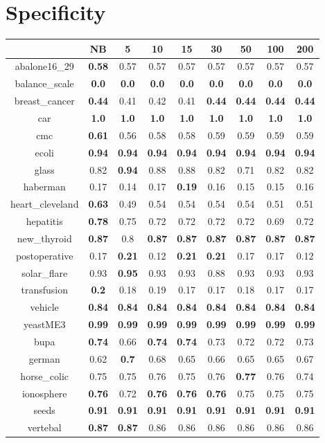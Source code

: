 \documentclass{article}%
\begin{document}
%
\section*{Specificity}%
\begin{tabular}{c|cccccccc}%
\hline%
&NB&5&10&15&30&50&100&200\\%
\hline%
abalone16\_29&\textbf{0.58}&0.57&0.57&0.57&0.57&0.57&0.57&0.57\\%
\hline%
balance\_scale&\textbf{0.0}&\textbf{0.0}&\textbf{0.0}&\textbf{0.0}&\textbf{0.0}&\textbf{0.0}&\textbf{0.0}&\textbf{0.0}\\%
\hline%
breast\_cancer&\textbf{0.44}&0.41&0.42&0.41&\textbf{0.44}&\textbf{0.44}&\textbf{0.44}&\textbf{0.44}\\%
\hline%
car&\textbf{1.0}&\textbf{1.0}&\textbf{1.0}&\textbf{1.0}&\textbf{1.0}&\textbf{1.0}&\textbf{1.0}&\textbf{1.0}\\%
\hline%
cmc&\textbf{0.61}&0.56&0.58&0.58&0.59&0.59&0.59&0.59\\%
\hline%
ecoli&\textbf{0.94}&\textbf{0.94}&\textbf{0.94}&\textbf{0.94}&\textbf{0.94}&\textbf{0.94}&\textbf{0.94}&\textbf{0.94}\\%
\hline%
glass&0.82&\textbf{0.94}&0.88&0.88&0.82&0.71&0.82&0.82\\%
\hline%
haberman&0.17&0.14&0.17&\textbf{0.19}&0.16&0.15&0.15&0.16\\%
\hline%
heart\_cleveland&\textbf{0.63}&0.49&0.54&0.54&0.54&0.54&0.51&0.51\\%
\hline%
hepatitis&\textbf{0.78}&0.75&0.72&0.72&0.72&0.72&0.69&0.72\\%
\hline%
new\_thyroid&\textbf{0.87}&0.8&\textbf{0.87}&\textbf{0.87}&\textbf{0.87}&\textbf{0.87}&\textbf{0.87}&\textbf{0.87}\\%
\hline%
postoperative&0.17&\textbf{0.21}&0.12&\textbf{0.21}&\textbf{0.21}&0.17&0.17&0.12\\%
\hline%
solar\_flare&0.93&\textbf{0.95}&0.93&0.93&0.88&0.93&0.93&0.93\\%
\hline%
transfusion&\textbf{0.2}&0.18&0.19&0.17&0.17&0.18&0.17&0.17\\%
\hline%
vehicle&\textbf{0.84}&\textbf{0.84}&\textbf{0.84}&\textbf{0.84}&\textbf{0.84}&\textbf{0.84}&\textbf{0.84}&\textbf{0.84}\\%
\hline%
yeastME3&\textbf{0.99}&\textbf{0.99}&\textbf{0.99}&\textbf{0.99}&\textbf{0.99}&\textbf{0.99}&\textbf{0.99}&\textbf{0.99}\\%
\hline%
bupa&\textbf{0.74}&0.66&\textbf{0.74}&\textbf{0.74}&0.73&0.72&0.72&0.73\\%
\hline%
german&0.62&\textbf{0.7}&0.68&0.65&0.66&0.65&0.65&0.67\\%
\hline%
horse\_colic&0.75&0.75&0.76&0.75&0.76&\textbf{0.77}&0.76&0.74\\%
\hline%
ionosphere&\textbf{0.76}&0.72&\textbf{0.76}&\textbf{0.76}&\textbf{0.76}&0.75&0.75&0.75\\%
\hline%
seeds&\textbf{0.91}&\textbf{0.91}&\textbf{0.91}&\textbf{0.91}&\textbf{0.91}&\textbf{0.91}&\textbf{0.91}&\textbf{0.91}\\%
\hline%
vertebal&\textbf{0.87}&\textbf{0.87}&0.86&0.86&0.86&0.86&0.86&0.86\\%
\hline%
\end{tabular}
\end{document}
